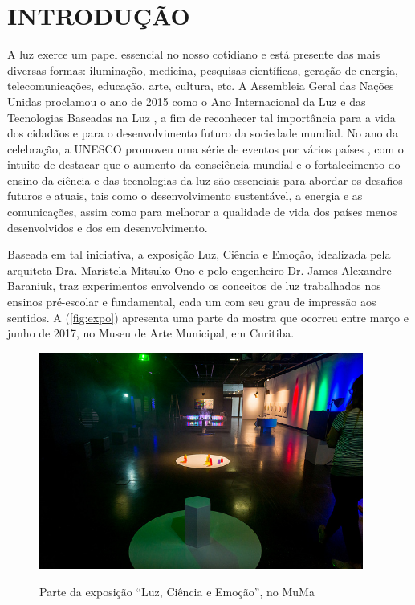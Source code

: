 
\chapter{INTRODUÇÃO}
\label{chap:introducao}

  A luz exerce um papel essencial no nosso cotidiano e está presente das mais diversas formas: iluminação, medicina, pesquisas científicas, geração de energia, telecomunicações, educação, arte, cultura, etc. A Assembleia Geral das Nações Unidas proclamou o ano de 2015 como o Ano Internacional da Luz e das Tecnologias Baseadas na Luz \cite{resolucao-onu}, a fim de reconhecer tal importância para a vida dos cidadãos e para o desenvolvimento futuro da sociedade mundial. No ano da celebração, a UNESCO promoveu uma série de eventos por vários países , com o intuito de destacar que o aumento da consciência mundial e o fortalecimento do ensino da ciência e das tecnologias da luz são essenciais para abordar os desafios futuros e atuais, tais como o desenvolvimento sustentável, a energia e as comunicações, assim como para melhorar a qualidade de vida dos países menos desenvolvidos e dos em desenvolvimento.
  
  Baseada em tal iniciativa, a exposição Luz, Ciência e Emoção, idealizada pela arquiteta Dra. Maristela Mitsuko Ono e pelo engenheiro Dr. James Alexandre Baraniuk, traz experimentos envolvendo os conceitos de luz trabalhados nos ensinos pré-escolar e fundamental, cada um com seu grau de impressão aos sentidos. A (\autoref{fig:expo}) apresenta uma parte da mostra que ocorreu entre março e junho de 2017, no Museu de Arte Municipal, em Curitiba.
  
  \begin{figure}[H]%
    \centering
    \caption{Parte da exposição ``Luz, Ciência e Emoção'', no MuMa}
    \includegraphics[width=0.95\textwidth]{./dados/figuras/expo}
    \label{fig:expo}
\end{figure}
  
